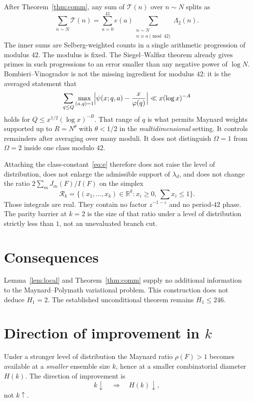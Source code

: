 \documentclass[11pt,a4paper]{article}
\theoremstyle{plain}
\theoremstyle{remark}
\newcommand{\RR}{\mathbb{R}}
\newcommand{\cR}{\mathcal{R}}
\newcommand{\cT}{\mathcal{T}}
\newcommand{\Lam}{\Lambda}
\begin{document}
After Theorem~\ref{thm:comm}, any sum of \(\cT(n)\) over \(n\sim N\) splits as
\[
\sum_{n\sim N}\cT(n)
=\sum_{a=0}^{41}e(a)\sum_{\substack{n\sim N\\ n\equiv a\pmod{42}}}\Lam_2(n).
\]
The inner sums are Selberg-weighted counts in a single arithmetic progression of modulus \(42\). The modulus is fixed. The Siegel--Walfisz theorem already gives primes in such progressions to an error smaller than any negative power of \(\log N\). Bombieri--Vinogradov is not the missing ingredient for modulus \(42\): it is the averaged statement that
\[
\sum_{q\le Q}\max_{(a,q)=1}\Bigl|\psi(x;q,a)-\frac{x}{\varphi(q)}\Bigr|
\ll x(\log x)^{-A}
\]
holds for \(Q\le x^{1/2}(\log x)^{-B}\). That range of \(q\) is what permits Maynard weights supported up to \(R=N^\theta\) with \(\theta<1/2\) in the \emph{multidimensional} setting. It controls remainders after averaging over many moduli. It does not distinguish \(\Omega=1\) from \(\Omega=2\) inside one class modulo \(42\).

Attaching the class-constant~\eqref{eq:e} therefore does not raise the level of distribution, does not enlarge the admissible support of \(\lambda_d\), and does not change the ratio \(2\sum_m J_m(F)/I(F)\) on the simplex
\[
\cR_k=\bigl\{(x_1,\ldots,x_k)\in\RR^k:x_i\ge 0,\ \textstyle\sum x_i\le 1\bigr\}.
\]
Those integrals are real. They contain no factor \(z^{-1-\varepsilon}\) and no period-\(42\) phase. The parity barrier at \(k=2\) is the size of that ratio under a level of distribution strictly less than \(1\), not an unevaluated branch cut.

\section{Consequences}

Lemma~\ref{lem:local} and Theorem~\ref{thm:comm} supply no additional information to the Maynard--Polymath variational problem. This construction does not deduce \(H_1=2\). The established unconditional theorem remains \(H_1\le 246\).

\section{Direction of improvement in \(k\)}
\label{sec:kdir}

Under a stronger level of distribution the Maynard ratio \(\rho(F)>1\) becomes available at a \emph{smaller} ensemble size \(k\), hence at a smaller combinatorial diameter \(H(k)\). The direction of improvement is
\[
k\downarrow \quad\Longrightarrow\quad H(k)\downarrow,
\]
not \(k\uparrow\).
\end{document}
